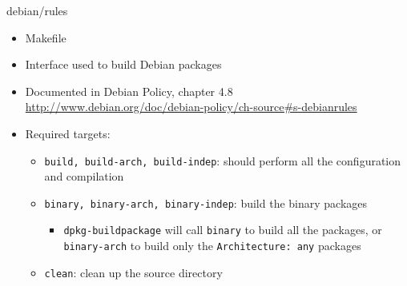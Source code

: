 \documentclass[10pt,final]{beamer}
\begin{document}
\begin{frame}[fragile=singleslide]{debian/rules}
  \hbr
  \begin{itemize}
  \item Makefile
    \br
  \item Interface used to build Debian packages
    \br
  \item Documented in Debian Policy, chapter 4.8\\
    {\small \url{http://www.debian.org/doc/debian-policy/ch-source\#s-debianrules}}
    \br
  \item Required targets:
    \begin{itemize}
    \item \texttt{build, build-arch, build-indep}: should perform all the configuration and compilation
      \hbr
    \item \texttt{binary, binary-arch, binary-indep}: build the binary packages
      \begin{itemize}
      \item \texttt{dpkg-buildpackage} will call \texttt{binary} to build all
        the packages, or \texttt{binary-arch} to build only the
        \texttt{Architecture:~any} packages
      \end{itemize}
      \hbr
    \item \texttt{clean}: clean up the source directory
    \end{itemize}
  \end{itemize}
\end{frame}
\end{document}
